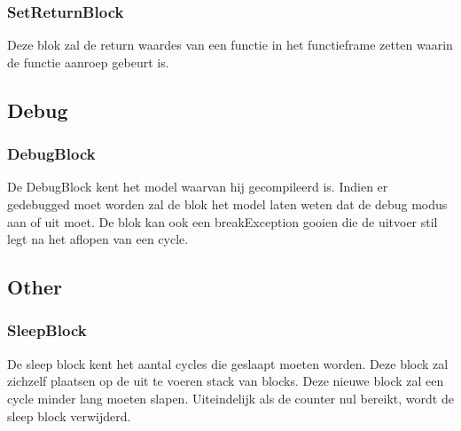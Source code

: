 \documentclass[]{article}
\begin{document}
\subsubsection{SetReturnBlock}
Deze blok zal de return waardes van een functie in het functieframe zetten waarin de functie aanroep gebeurt is.

\subsection{Debug}
\subsubsection{DebugBlock}
De DebugBlock kent het model waarvan hij gecompileerd is. Indien er gedebugged moet worden zal de blok het model laten weten dat de debug modus aan of uit moet. De blok kan ook een breakException gooien die de uitvoer stil legt na het aflopen van een cycle.

\subsection{Other}
\subsubsection{SleepBlock}
De sleep block kent het aantal cycles die geslaapt moeten worden. Deze block zal zichzelf plaatsen op de uit te voeren stack van blocks. Deze nieuwe block zal een cycle minder lang moeten slapen. Uiteindelijk als de counter nul bereikt, wordt de sleep block verwijderd.
\end{document}

